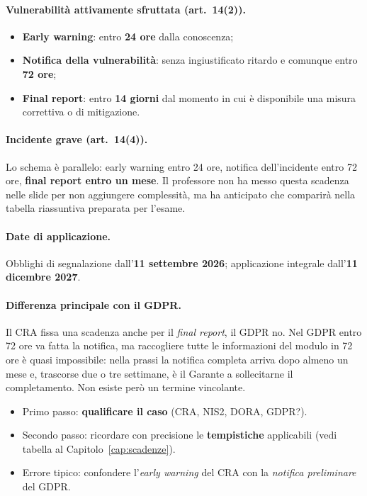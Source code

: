 \paragraph{Vulnerabilità attivamente sfruttata (art.~14(2)).}
\begin{itemize}
  \item \textbf{Early warning}: entro \textbf{24 ore} dalla conoscenza;
  \item \textbf{Notifica della vulnerabilità}: senza ingiustificato ritardo e comunque entro \textbf{72 ore};
  \item \textbf{Final report}: entro \textbf{14 giorni} dal momento in cui è disponibile una misura
    correttiva o di mitigazione.
\end{itemize}

\paragraph{Incidente grave (art.~14(4)).} Lo schema è parallelo: early warning entro 24 ore,
notifica dell'incidente entro 72 ore, \textbf{final report entro un mese}. Il professore non ha
messo questa scadenza nelle slide per non aggiungere complessità, ma ha anticipato che comparirà
nella tabella riassuntiva preparata per l'esame.

\paragraph{Date di applicazione.} Obblighi di segnalazione dall'\textbf{11 settembre 2026};
applicazione integrale dall'\textbf{11 dicembre 2027}.

\paragraph{Differenza principale con il GDPR.}
Il CRA fissa una scadenza anche per il \emph{final report}, il GDPR no. Nel GDPR entro 72 ore va
fatta la notifica, ma raccogliere tutte le informazioni del modulo in 72 ore è quasi impossibile:
nella prassi la notifica completa arriva dopo almeno un mese e, trascorse due o tre settimane, è
il Garante a sollecitarne il completamento. Non esiste però un termine vincolante.

\begin{esame}
\begin{itemize}
  \item Primo passo: \textbf{qualificare il caso} (CRA, NIS2, DORA, GDPR?).
  \item Secondo passo: ricordare con precisione le \textbf{tempistiche} applicabili
    (vedi tabella al Capitolo~\ref{cap:scadenze}).
  \item Errore tipico: confondere l'\emph{early warning} del CRA con la \emph{notifica preliminare}
    del GDPR.
\end{itemize}
\end{esame}

